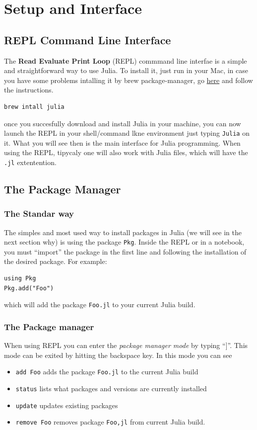 \documentclass[11pt]{article}
\begin{document}
\section{Setup and Interface}
\label{sec:org23727e2}
\subsection{REPL Command Line Interface}
\label{sec:org6ad2e33}
The \textbf{Read Evaluate Print Loop} (REPL) commmand line interfae is a simple and straightforward way to use Julia. To install it, just run in your Mac, in case you have some problems intalling it by brew package-manager, go \href{https://julialang.org/downloads/}{here} and follow the instructions.

\begin{verbatim}
brew intall julia
\end{verbatim}

once you succesfully download and install Julia in your machine, you can now launch the REPL in your shell/command lkne environment just typing \texttt{Julia} on it. What you will see then is the main interface for  Julia programming. When using the REPL, tipycaly one will also work with Julia files, which will have the \texttt{.jl} extentention.

\subsection{The Package Manager}
\label{sec:org4dc4116}
\subsubsection{The Standar way}
\label{sec:org85c8245}
The simples and most used way to install packages in Julia (we will see in the next section why) is using the package \texttt{Pkg}. Inside the REPL or in a notebook, you must ``import'' the package in the first line and following the installation of the desired package. For example:

\begin{verbatim}
using Pkg
Pkg.add("Foo")
\end{verbatim}

which will add the package \texttt{Foo.jl} to your current Julia build.

\subsubsection{The Package manager}
\label{sec:org989ec8b}
When using REPL you can enter the \emph{package manager mode} by typing ``]''. This mode can be exited by hitting the backspace key. In this mode you can see
\begin{itemize}
\item \texttt{add Foo} adds the package \texttt{Foo.jl} to the current Julia build
\item \texttt{status} lists what packages and versions are currently installed
\item \texttt{update} updates existing packages
\item \texttt{remove Foo} removes package \texttt{Foo,jl} from current Julia build.
\end{itemize}
\end{document}
